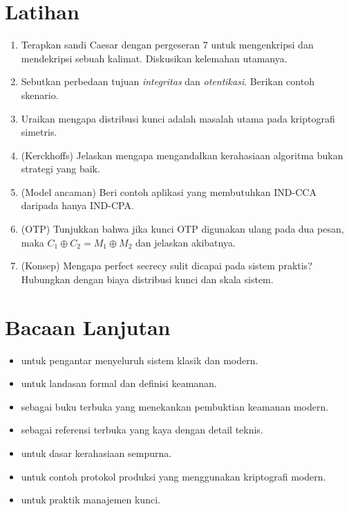 \documentclass[../main.tex]{subfiles}
\begin{document}
\section{Latihan}
\begin{enumerate}
  \item Terapkan sandi Caesar dengan pergeseran 7 untuk mengenkripsi dan mendekripsi sebuah kalimat. Diskusikan kelemahan utamanya.
  \item Sebutkan perbedaan tujuan \emph{integritas} dan \emph{otentikasi}. Berikan contoh skenario.
  \item Uraikan mengapa distribusi kunci adalah masalah utama pada kriptografi simetris.
  \item (Kerckhoffs) Jelaskan mengapa mengandalkan kerahasiaan algoritma bukan strategi yang baik.
  \item (Model ancaman) Beri contoh aplikasi yang membutuhkan IND-CCA daripada hanya IND-CPA.
  \item (OTP) Tunjukkan bahwa jika kunci OTP digunakan ulang pada dua pesan, maka \(C_1\oplus C_2=M_1\oplus M_2\) dan jelaskan akibatnya.
  \item (Konsep) Mengapa perfect secrecy sulit dicapai pada sistem praktis? Hubungkan dengan biaya distribusi kunci dan skala sistem.
\end{enumerate}

\section{Bacaan Lanjutan}
\begin{itemize}
  \item \citep{stallings} untuk pengantar menyeluruh sistem klasik dan modern.
  \item \citep{katzlindell} untuk landasan formal dan definisi keamanan.
  \item \citep{bonehshoup} sebagai buku terbuka yang menekankan pembuktian keamanan modern.
  \item \citep{menezes} sebagai referensi terbuka yang kaya dengan detail teknis.
  \item \citep{shannon1949} untuk dasar kerahasiaan sempurna.
  \item \citep{rfc8446} untuk contoh protokol produksi yang menggunakan kriptografi modern.
  \item \citep{nist_sp_800_57pt1r5} untuk praktik manajemen kunci.
\end{itemize}
\end{document}
